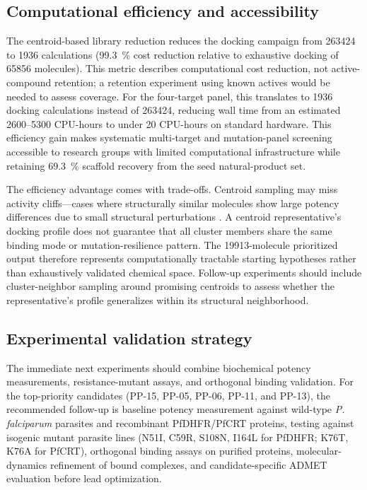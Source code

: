 \documentclass[journal=jcisd8,manuscript=article]{achemso}
\begin{document}
\subsection{Computational efficiency and accessibility}\label{sec:disc_efficiency}
The centroid-based library reduction reduces the docking campaign from \num{263424} to \num{1936} calculations (\qty{99.3}{\percent} cost reduction relative to exhaustive docking of \num{65856} molecules). This metric describes computational cost reduction, not active-compound retention; a retention experiment using known actives would be needed to assess coverage. For the four-target panel, this translates to \num{1936} docking calculations instead of \num{263424}, reducing wall time from an estimated \numrange{2600}{5300} CPU-hours to under \num{20} CPU-hours on standard hardware. This efficiency gain makes systematic multi-target and mutation-panel screening accessible to research groups with limited computational infrastructure while retaining \qty{69.3}{\percent} scaffold recovery from the seed natural-product set.

The efficiency advantage comes with trade-offs. Centroid sampling may miss activity cliffs—cases where structurally similar molecules show large potency differences due to small structural perturbations \cite{Stumpfe2012}. A centroid representative's docking profile does not guarantee that all cluster members share the same binding mode or mutation-resilience pattern. The \num{19913}-molecule prioritized output therefore represents computationally tractable starting hypotheses rather than exhaustively validated chemical space. Follow-up experiments should include cluster-neighbor sampling around promising centroids to assess whether the representative's profile generalizes within its structural neighborhood.

\subsection{Experimental validation strategy}\label{sec:disc_validation}
The immediate next experiments should combine biochemical potency measurements, resistance-mutant assays, and orthogonal binding validation. For the top-priority candidates (PP-15, PP-05, PP-06, PP-11, and PP-13), the recommended follow-up is baseline potency measurement against wild-type \emph{P. falciparum} parasites and recombinant PfDHFR/PfCRT proteins, testing against isogenic mutant parasite lines (N51I, C59R, S108N, I164L for PfDHFR; K76T, K76A for PfCRT), orthogonal binding assays on purified proteins, molecular-dynamics refinement of bound complexes, and candidate-specific ADMET evaluation before lead optimization.
\end{document}
